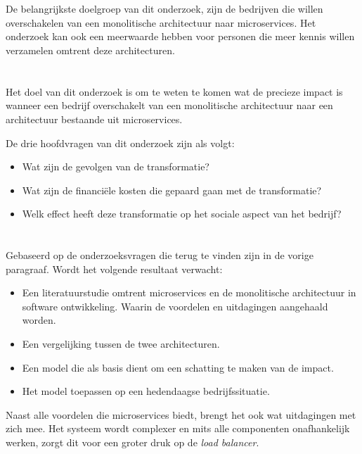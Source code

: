 \section{}
\label{sec:probleemstelling}

De belangrijkste doelgroep van dit onderzoek, zijn de bedrijven die willen overschakelen van een monolitische architectuur naar microservices. Het onderzoek kan ook een meerwaarde hebben voor personen die meer kennis willen verzamelen omtrent deze architecturen. 

\section{}
\label{sec:onderzoeksvraag}

Het doel van dit onderzoek is om te weten te komen wat de precieze impact is wanneer een bedrijf overschakelt van een monolitische architectuur naar een architectuur bestaande uit microservices.

De drie hoofdvragen van dit onderzoek zijn als volgt:
\begin{itemize}
    \item Wat zijn de gevolgen van de transformatie?
    \item Wat zijn de financiële kosten die gepaard gaan met de transformatie?
    \item Welk effect heeft deze transformatie op het sociale aspect van het bedrijf?
\end{itemize}

\section{}
\label{sec:onderzoeksdoelstelling}

Gebaseerd op de onderzoeksvragen die terug te vinden zijn in de vorige paragraaf. Wordt het volgende resultaat verwacht:

\begin{itemize}
    \item Een literatuurstudie omtrent microservices en de monolitische architectuur in software ontwikkeling. Waarin de voordelen en uitdagingen aangehaald worden.
    \item Een vergelijking tussen de twee architecturen. 
    \item Een model die als basis dient om een schatting te maken van de impact.
    \item Het model toepassen op een hedendaagse bedrijfssituatie.
\end{itemize}
Naast alle voordelen die microservices biedt, brengt het ook wat uitdagingen met zich mee. Het systeem wordt complexer en mits alle componenten onafhankelijk werken, zorgt dit voor een groter druk op de \emph{load balancer}.

